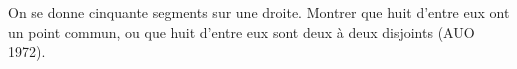 On se donne cinquante segments sur une droite. Montrer que huit d'entre eux ont un point commun, ou que huit d'entre eux sont deux à deux disjoints (AUO 1972).

